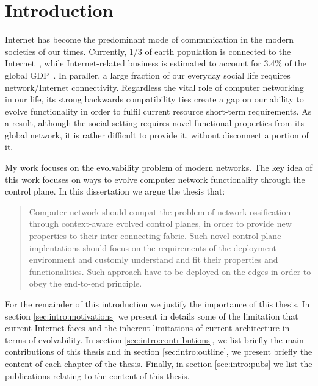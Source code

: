 \chapter{Introduction}
\ifpdf
    \graphicspath{{Introduction/IntroductionFigs/PNG/}{Introduction/IntroductionFigs/PDF/}{Introduction/IntroductionFigs/}}
\else
    \graphicspath{{Introduction/IntroductionFigs/EPS/}{Introduction/IntroductionFigs/}}
\fi

Internet has become the predominant mode of communication in the modern
societies of our times. Currently, 1/3 of earth population is connected to the
Internet~\cite{itufacts2011}, while Internet-related business is estimated to
account for 3.4\% of the global GDP~\cite{duRausas:2011un}. In paraller, a large
fraction of our everyday social life requires network/Internet connectivity.
Regardless the vital role of computer networking in our life, its strong
backwards compatibility ties create a gap on our ability to evolve functionality
in order to fulfil current resource short-term requirements. As a result,
although the social setting requires novel functional properties from its global
network, it is rather difficult to provide it, without disconnect a portion of
it.

My work focuses on the evolvability problem of modern networks. The key idea of
this work focuses on ways to evolve computer network functionality through
the control plane. In this dissertation we argue the thesis that: 

\begin{quotation}
  Computer network should compat the problem of network ossification through
  context-aware evolved control planes, in order to provide new properties to
  their inter-connecting fabric. Such novel control plane implentations should focus
  on the requirements of the deployment environment and customly understand and
  fit their properties and functionalities. Such approach have to be
  deployed on the edges in order to obey the end-to-end principle.  
\end{quotation}

For the remainder of this introduction we justify the importance of this thesis. In
section \ref{sec:intro:motivations} we present in details some of the limitation
that current Internet faces and the inherent limitations of current architecture
in terms of evolvability. In section \ref{sec:intro:contributions}, we
list briefly the main contributions of this thesis and in section
\ref{sec:intro:outline}, we present briefly the content of each chapter of the
thesis. Finally, in section \ref{sec:intro:pubs} we list the publications
relating to the content of this thesis. 

